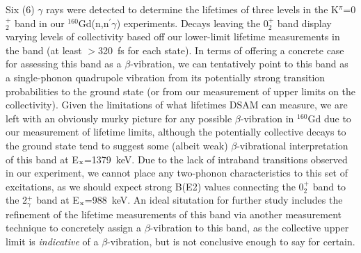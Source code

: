 Six (6) $\gamma$ rays were detected to determine the lifetimes of three levels in the K$^\pi$=0$^+_2$ band in our $^{160}$Gd(n,n$^\prime\gamma$) experiments. Decays leaving the 0$^+_2$ band display varying levels of collectivity based off our lower-limit lifetime measurements in the band (at least $>$320~fs for each state). In terms of offering a concrete case for assessing this band as a $\beta$-vibration, we can tentatively point to this band as a single-phonon quadrupole vibration from its potentially strong transition probabilities to the ground state (or from our measurement of upper limits on the collectivity). Given the limitations of what lifetimes DSAM can measure, we are left with an obviously murky picture for any possible $\beta$-vibration in $^{160}$Gd due to our measurement of lifetime limits, although the potentially collective decays to the ground state tend to suggest some (albeit weak) $\beta$-vibrational interpretation of this band at E$_{\rm x}$=1379~keV. Due to the lack of intraband transitions observed in our experiment, we cannot place any two-phonon characteristics to this set of excitations, as we should expect strong B(E2) values connecting the 0$^+_2$ band to the 2$^+_\gamma$ band at E$_{\rm x}$=988~keV. An ideal situtation for further study includes the refinement of the lifetime measurements of this band via another measurement technique to concretely assign a $\beta$-vibration to this band, as the collective upper limit is \textit{indicative} of a $\beta$-vibration, but is not conclusive enough to say for certain. 

